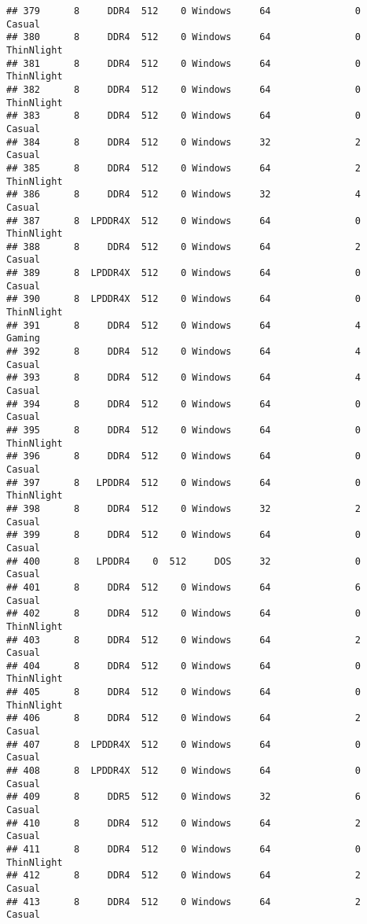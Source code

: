 \documentclass[
]{article}
\begin{document}
\begin{verbatim}
## 379      8     DDR4  512    0 Windows     64               0     Casual
## 380      8     DDR4  512    0 Windows     64               0 ThinNlight
## 381      8     DDR4  512    0 Windows     64               0 ThinNlight
## 382      8     DDR4  512    0 Windows     64               0 ThinNlight
## 383      8     DDR4  512    0 Windows     64               0     Casual
## 384      8     DDR4  512    0 Windows     32               2     Casual
## 385      8     DDR4  512    0 Windows     64               2 ThinNlight
## 386      8     DDR4  512    0 Windows     32               4     Casual
## 387      8  LPDDR4X  512    0 Windows     64               0 ThinNlight
## 388      8     DDR4  512    0 Windows     64               2     Casual
## 389      8  LPDDR4X  512    0 Windows     64               0     Casual
## 390      8  LPDDR4X  512    0 Windows     64               0 ThinNlight
## 391      8     DDR4  512    0 Windows     64               4     Gaming
## 392      8     DDR4  512    0 Windows     64               4     Casual
## 393      8     DDR4  512    0 Windows     64               4     Casual
## 394      8     DDR4  512    0 Windows     64               0     Casual
## 395      8     DDR4  512    0 Windows     64               0 ThinNlight
## 396      8     DDR4  512    0 Windows     64               0     Casual
## 397      8   LPDDR4  512    0 Windows     64               0 ThinNlight
## 398      8     DDR4  512    0 Windows     32               2     Casual
## 399      8     DDR4  512    0 Windows     64               0     Casual
## 400      8   LPDDR4    0  512     DOS     32               0     Casual
## 401      8     DDR4  512    0 Windows     64               6     Casual
## 402      8     DDR4  512    0 Windows     64               0 ThinNlight
## 403      8     DDR4  512    0 Windows     64               2     Casual
## 404      8     DDR4  512    0 Windows     64               0 ThinNlight
## 405      8     DDR4  512    0 Windows     64               0 ThinNlight
## 406      8     DDR4  512    0 Windows     64               2     Casual
## 407      8  LPDDR4X  512    0 Windows     64               0     Casual
## 408      8  LPDDR4X  512    0 Windows     64               0     Casual
## 409      8     DDR5  512    0 Windows     32               6     Casual
## 410      8     DDR4  512    0 Windows     64               2     Casual
## 411      8     DDR4  512    0 Windows     64               0 ThinNlight
## 412      8     DDR4  512    0 Windows     64               2     Casual
## 413      8     DDR4  512    0 Windows     64               2     Casual

\end{verbatim}
\end{document}
